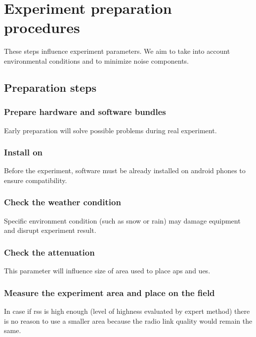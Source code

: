 \section{Experiment preparation procedures}\label{experiment-preparation-procedures}

These steps influence experiment parameters. We aim to take into account
environmental conditions and to minimize noise components.


\subsection{Preparation steps}\label{steps}

\subsubsection{Prepare hardware and software bundles}

Early preparation will solve possible problems during real experiment.

\subsubsection{Install  on }

Before the experiment, software must be already installed on \gls{android} phones to ensure compatibility.

\subsubsection{Check the weather condition}

Specific environment condition (such as snow or rain) may damage equipment
and disrupt experiment result.

\subsubsection{Check the  attenuation}

This parameter will influence size of area used to place \glspl{ap} and \glspl{ue}.


\subsubsection{Measure the experiment area and place  on the field}

In case if \acrshort{rss} is high enough (level of highness evaluated by expert method) there is no reason to use a smaller area
because the radio link quality would remain the same.